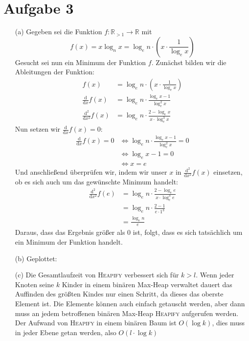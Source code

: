 \documentclass{scrartcl}
\begin{document}
\section{Aufgabe 3}
\begin{enumerate}
\item[(a)]
Gegeben sei die Funktion $f : \mathbb{R}_{>1} \to \mathbb{R}$ mit
\[
    f(x) = x \log_n x = \log_e n \cdot \left( x \cdot \frac{1}{\log_e x} \right)
\]
Gesucht sei nun ein Minimum der Funktion $f$. Zunächst bilden wir die
Ableitungen der Funktion:
\begin{align*}
f(x) &= \log_e n \cdot \left( x \cdot \frac{1}{\log_e x} \right) \\
\frac{\mathrm d}{\mathrm d x} f(x) &= \log_e n \cdot \frac{\log_e x - 1}{\log_e^2 x} \\
\frac{\mathrm d^2}{\mathrm d x^2} f(x) &= \log_e n \cdot \frac{2 - \log_e x}{x \cdot \log_e^3 x}
\end{align*}
Nun setzen wir $\frac{\mathrm d}{\mathrm d x} f(x) = 0$:
\begin{align*}
\frac{\mathrm d}{\mathrm d x} f(x) = 0 
    &\Leftrightarrow \log_e n \cdot \frac{\log_e x - 1}{\log_e^2 x} = 0 \\
    &\Leftrightarrow \log_e x - 1 = 0 \\
    &\Leftrightarrow x = e
\end{align*}
Und anschließend überprüfen wir, indem wir unser $x$ in $\frac{\mathrm
d^2}{\mathrm d x^2} f(x)$ einsetzen, ob es sich auch um das gewünschte Minimum
handelt:
\begin{align*}
\frac{\mathrm d^2}{\mathrm d x^2} f(e) &= \log_e n \cdot \frac{2 - \log_e e}{x
\cdot \log_e^3 e} \\
&= \log_e n \cdot \frac{2 - 1}{e \cdot 1^3} \\
&= \frac{\log_e n}{e}
\end{align*}
Daraus, dass das Ergebnis größer als 0 ist, folgt, dass es sich tatsächlich um
ein Minimum der Funktion handelt.

\item[(b)] Geplottet: \\

\item[(c)]
Die Gesamtlaufzeit von \textsc{Heapify} verbessert sich für $k>l$. 
Wenn jeder Knoten seine $k$ Kinder in einem binären Max-Heap verwaltet 
dauert das Auffinden des größten Kindes nur einen Schritt, da dieses das 
oberste Element ist. Die Elemente können auch einfach getauscht werden, 
aber dann muss an jedem betroffenen binären Max-Heap \textsc{Heapify}
aufgerufen werden. Der Aufwand von \textsc{Heapify} in einem binären 
Baum ist $O(\log k)$, dies muss in jeder Ebene getan werden, also 
$O(l \cdot \log k)$ 
  

\end{enumerate}
\end{document}
